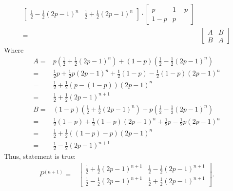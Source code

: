 \documentclass[12pt]{article}
\begin{document}
\begin{solution}
\begin{align}
\begin{bmatrix}
\frac{1}{2} - \frac{1}{2}(2p - 1)^{n} & \frac{1}{2} + \frac{1}{2}(2p - 1)^{n}
\end{bmatrix} \cdot \begin{bmatrix}
p & 1 - p \\
1 - p & p 
\end{bmatrix} \\
= & \begin{bmatrix}
A & B \\
B & A 
\end{bmatrix}
\end{align}
Where
\begin{align}
    A = & p(\frac{1}{2} + \frac{1}{2}(2p - 1)^{n}) + (1-p)(\frac{1}{2} - \frac{1}{2}(2p - 1)^{n})\\
      = & \frac{1}{2}p + \frac{1}{2}p(2p - 1)^{n} + \frac{1}{2}(1-p) - \frac{1}{2}(1-p)(2p - 1)^{n} \\
      = & \frac{1}{2} + \frac{1}{2}(p - (1-p))(2p - 1)^{n}\\
      = & \frac{1}{2} + \frac{1}{2}(2p - 1)^{n+1} \\
    B = & (1-p)(\frac{1}{2} + \frac{1}{2}(2p - 1)^{n}) + p(\frac{1}{2} - \frac{1}{2}(2p - 1)^{n})\\
      = & \frac{1}{2}(1-p) + \frac{1}{2}(1-p)(2p - 1)^{n} + \frac{1}{2}p - \frac{1}{2}p(2p - 1)^{n} \\
      = & \frac{1}{2} + \frac{1}{2}((1-p)-p)(2p - 1)^{n}\\
      = & \frac{1}{2} - \frac{1}{2}(2p - 1)^{n+1} 
\end{align}
Thus, statement is true:
\begin{align}
P^{(n+1)} = & \begin{bmatrix}
\frac{1}{2} + \frac{1}{2}(2p - 1)^{n+1} & \frac{1}{2} - \frac{1}{2}(2p - 1)^{n+1} \\
\frac{1}{2} - \frac{1}{2}(2p - 1)^{n+1} & \frac{1}{2} + \frac{1}{2}(2p - 1)^{n+1}
\end{bmatrix}.
\end{align}

\end{solution}
\end{document}
